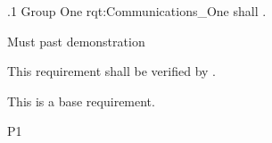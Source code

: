 \ONERQMTV
{\RqtNumberBase.1}
{Group One}
{rqt:Communications_One}
{\ThisSys shall \TBD.}
{
	\item [Phase 1] Must past demonstration
}
{This requirement shall be verified by \TBD.}
{
\item [N/A] This is a base requirement.
}
{
	\item \TBD
}
{P1}

